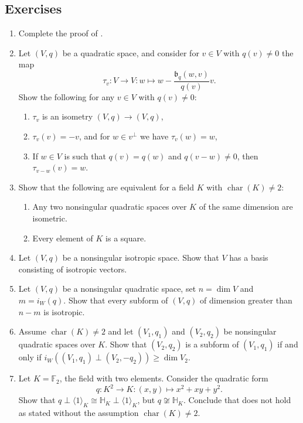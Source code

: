 \documentclass[12pt, leqno, british]{amsart}
\theoremstyle{definition}
\theoremstyle{plain}
\theoremstyle{remark}
\newcommand{\mf}{\mathfrak}
\newcommand{\mbb}{\mathbb}
\newcommand{\ff}{\mbb F}
\DeclareMathOperator{\charac}{char}
\DeclareMathOperator{\rad}{rad}
\begin{document}
\subsection{Exercises}
\begin{enumerate}
\item Complete the proof of .
\item\label{ex-reflections} Let $(V, q)$ be a quadratic space, and consider for $v \in V$ with $q(v) \neq 0$ the map
$$ \tau_v : V \to V : w \mapsto w - \frac{\mf{b}_q(w, v)}{q(v)}v.$$
Show the following for any $v \in V$ with $q(v) \neq 0$:
\begin{enumerate}
\item $\tau_v$ is an isometry $(V, q) \to (V, q)$,
\item $\tau_v(v) = -v$, and for $w \in v^\perp$ we have $\tau_v(w) = w$,
\item If $w \in V$ is such that $q(v) = q(w)$ and $q(v-w) \neq 0$, then $\tau_{v-w}(v) = w$.
\end{enumerate}
\item Show that the following are equivalent for a field $K$ with $\charac(K) \neq 2$:
\begin{enumerate}
\item Any two nonsingular quadratic spaces over $K$ of the same dimension are isometric.
\item Every element of $K$ is a square.
\end{enumerate}
\item Let $(V, q)$ be a nonsingular isotropic space.
Show that $V$ has a basis consisting of isotropic vectors.
\item Let $(V, q)$ be a nonsingular quadratic space, set $n = \dim V$ and $m = i_W(q)$.
Show that every subform of $(V, q)$ of dimension greater than $n - m$ is isotropic.
\item Assume $\charac(K) \neq 2$ and let $(V_1, q_1)$ and $(V_2, q_2)$ be nonsingular quadratic spaces over $K$.
Show that $(V_2, q_2)$ is a subform of $(V_1, q_1)$ if and only if $i_W((V_1, q_1) \perp (V_2, -q_2)) \geq \dim V_2$.
\item Let $K = \ff_2$, the field with two elements. Consider the quadratic form
\begin{displaymath}
q : K^2 \to K : (x, y) \mapsto x^2 + xy + y^2.
\end{displaymath}
Show that $q \perp \langle 1 \rangle_K \cong \mbb{H}_K \perp \langle 1 \rangle_K$, but $q \not\cong \mbb{H}_K$.
Conclude that  does not hold as stated without the assumption $\charac(K) \neq 2$.
\end{enumerate}
\end{document}
